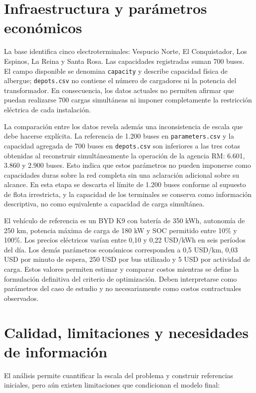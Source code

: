 \section{Infraestructura y parámetros económicos}

La base identifica cinco electroterminales: Vespucio Norte, El Conquistador, Los
Espinos, La Reina y Santa Rosa. Las capacidades registradas suman 700 buses. El
campo disponible se denomina \texttt{capacity} y describe capacidad física de
albergue; \texttt{depots.csv} no contiene el número de cargadores ni la potencia
del transformador. En consecuencia, los datos actuales no permiten afirmar que
puedan realizarse 700 cargas simultáneas ni imponer completamente la restricción
eléctrica de cada instalación.

La comparación entre los datos revela además una inconsistencia de escala que
debe hacerse explícita. La referencia de 1.200 buses en
\texttt{parameters.csv} y la capacidad agregada de 700 buses en
\texttt{depots.csv} son inferiores a las tres cotas obtenidas al reconstruir
simultáneamente la operación de la agencia RM: 6.601, 3.860 y 2.900 buses. Esto
indica que estos parámetros no pueden imponerse como capacidades duras sobre la
red completa sin una aclaración adicional sobre su alcance. En esta etapa se
descarta el límite de 1.200 buses conforme al supuesto de flota irrestricta, y
la capacidad de los terminales se conserva como información descriptiva, no
como equivalente a capacidad de carga simultánea.

El vehículo de referencia es un BYD K9 con batería de 350 kWh, autonomía de 250
km, potencia máxima de carga de 180 kW y SOC permitido entre 10\% y 100\%. Los
precios eléctricos varían entre 0,10 y 0,22 USD/kWh en seis períodos del día. Los
demás parámetros económicos corresponden a 0,5 USD/km, 0,03 USD por minuto de
espera, 250 USD por bus utilizado y 5 USD por actividad de carga. Estos valores
permiten estimar y comparar costos mientras se define la formulación definitiva
del criterio de optimización. Deben interpretarse como parámetros del caso de
estudio y no necesariamente como costos contractuales observados.

\section{Calidad, limitaciones y necesidades de información}

El análisis permite cuantificar la escala del problema y construir referencias
iniciales, pero aún existen limitaciones que condicionan el modelo final:

